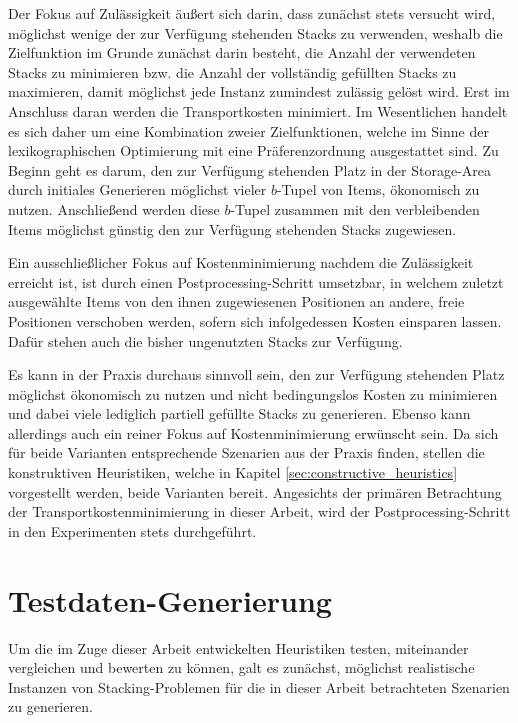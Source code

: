 Der Fokus auf Zulässigkeit äußert sich darin, dass zunächst stets versucht wird, möglichst wenige der zur Verfügung stehenden Stacks zu verwenden, weshalb die Zielfunktion im Grunde zunächst darin besteht, die Anzahl der verwendeten Stacks zu minimieren bzw. die Anzahl der vollständig gefüllten Stacks zu maximieren, damit möglichst jede Instanz zumindest zulässig gelöst wird.
Erst im Anschluss daran werden die Transportkosten minimiert.
Im Wesentlichen handelt es sich daher um eine Kombination zweier Zielfunktionen,
welche im Sinne der lexikographischen Optimierung mit eine Präferenzordnung ausgestattet sind.
Zu Beginn geht es darum, den zur Verfügung stehenden Platz in der Storage-Area durch initiales Generieren
möglichst vieler $b$-Tupel von Items, ökonomisch zu nutzen. Anschließend werden diese $b$-Tupel
zusammen mit den verbleibenden Items möglichst günstig den zur Verfügung stehenden Stacks zugewiesen.

Ein ausschließlicher Fokus auf Kostenminimierung nachdem die Zulässigkeit erreicht ist, ist durch
einen Postprocessing-Schritt umsetzbar, in welchem zuletzt ausgewählte Items von den ihnen zugewiesenen Positionen
an andere, freie Positionen verschoben werden, sofern sich infolgedessen Kosten einsparen lassen.
Dafür stehen auch die bisher ungenutzten Stacks zur Verfügung.

\pagebreak

Es kann in der Praxis durchaus sinnvoll sein, den zur Verfügung stehenden Platz möglichst ökonomisch zu nutzen
und nicht bedingungslos Kosten zu minimieren und dabei viele lediglich partiell gefüllte Stacks zu generieren.
Ebenso kann allerdings auch ein reiner Fokus auf Kostenminimierung erwünscht sein. Da sich für beide Varianten
entsprechende Szenarien aus der Praxis finden, stellen die konstruktiven Heuristiken,
welche in Kapitel \ref{sec:constructive_heuristics} vorgestellt werden, beide Varianten bereit.
Angesichts der primären Betrachtung der Transportkostenminimierung in dieser Arbeit,
wird der Postprocessing-Schritt in den Experimenten stets durchgeführt.

\section{Testdaten-Generierung}
\label{sec:test_data}

Um die im Zuge dieser Arbeit entwickelten Heuristiken testen, miteinander vergleichen
und bewerten zu können, galt es zunächst, möglichst realistische Instanzen von Stacking-Problemen
für die in dieser Arbeit betrachteten Szenarien zu generieren.

